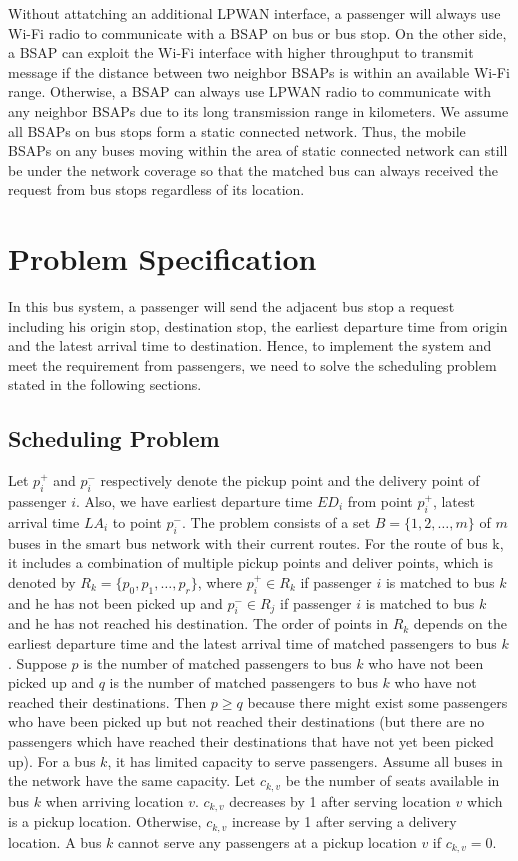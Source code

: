 \documentclass[runningheads]{llncs}
\begin{document}
Without attatching an additional LPWAN interface, a passenger will always use Wi-Fi radio to communicate with a BSAP on bus or bus stop. On the other side, a BSAP can exploit the Wi-Fi interface with higher throughput to transmit message if the distance between two neighbor BSAPs is within an available Wi-Fi range. Otherwise, a BSAP can always use LPWAN radio to communicate with any neighbor BSAPs due to its long transmission range in kilometers. We assume all BSAPs on bus stops form a static connected network. Thus, the mobile BSAPs on any buses moving within the area of static connected network can still be under the network coverage so that the matched bus can always received the request from bus stops regardless of its location.

\section{Problem Specification}
In this bus system, a passenger will send the adjacent bus stop a request including his origin stop, destination stop, the earliest departure time from origin and the latest arrival time to destination. Hence, to implement the system and meet the requirement from passengers, we need to solve the scheduling problem stated in the following sections.

\subsection{Scheduling Problem}
Let $p_i^+$ and $p_i^-$ respectively denote the pickup point and the delivery point of passenger $i$. Also, we have earliest departure time $ED_i$ from point $p_i^+$, latest arrival time $LA_i$ to point $p_i^-$. The problem consists of a set $B = \{1, 2, \dots, m\}$ of $m$ buses in the smart bus network with their current routes. For the route of bus k, it includes a combination of multiple pickup points and deliver points, which is denoted by $R_k = \{p_0, p_1, \dots, p_r\}$, where $p_i^+\in R_k$ if passenger $i$ is matched to bus $k$ and he has not been picked up and $p_i^-\in R_j$ if passenger $i$ is matched to bus $k$ and he has not reached his destination. The order of points in $R_k$ depends on the earliest departure time and the latest arrival time of matched passengers to bus $k$. Suppose $p$ is the number of matched passengers to bus $k$ who have not been picked up and $q$ is the number of matched passengers to bus $k$ who have not reached their destinations. Then $p \geq q$ because there might exist some passengers who have been picked up but not reached their destinations (but there are no passengers which have reached their destinations that have not yet been picked up). For a bus $k$, it has limited capacity to serve passengers. Assume all buses in the network have the same capacity. Let $c_{k,v}$ be the number of seats available in bus $k$ when arriving location $v$. $c_{k,v}$ decreases by 1 after serving location $v$ which is a pickup location. Otherwise, $c_{k,v}$ increase by 1 after serving a delivery location. A bus $k$ cannot serve any passengers at a pickup location $v$ if $c_{k,v} = 0$.
\end{document}
